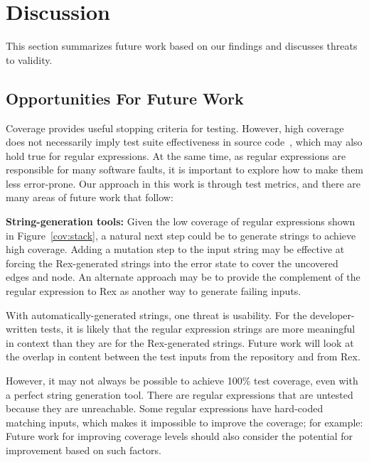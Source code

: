 \section{Discussion}
\label{sec:discussion}
This section summarizes future work based on our findings and discusses threats to validity.
\subsection{Opportunities For Future Work}
Coverage provides useful stopping criteria for testing. 
However, high coverage does not necessarily imply test suite effectiveness in source code~\cite{coveragetestsuitecorrelation}, which may also hold true for regular expressions. 
At the same time, as regular expressions are responsible for many software faults, it is important to explore how to make them less error-prone. Our approach in this work is through test metrics, and there are many areas of future work that follow:

\textbf{String-generation tools: } 
Given the low coverage of regular expressions shown in Figure~\ref{cov:stack}, a natural next step could be to generate strings to achieve high coverage. 
Adding a mutation step to the input string may be effective at forcing the Rex-generated strings into the error state to cover the uncovered edges and node. An alternate approach may be to provide the complement of the regular expression to Rex as another way to generate failing inputs. 

With automatically-generated strings, one threat is usability. For the developer-written tests, it is likely that the regular expression strings are more meaningful in context than they are for the Rex-generated strings. Future work will look at the overlap in content between the test inputs from the repository and from Rex. 

However, it may not always be possible to achieve 100\% test coverage, even with a perfect string generation tool. There are regular expressions that are untested because they are unreachable. Some regular expressions have hard-coded matching inputs, which makes it impossible to improve the coverage; for example: 
Future work for improving coverage levels should also consider the potential for improvement based on such factors. 

